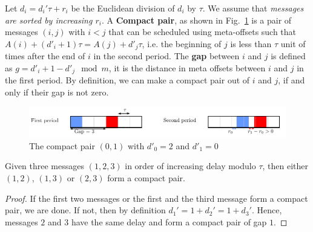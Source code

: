 \documentclass[a4paper,UKenglish,cleveref, autoref, thm-restate]{lipics-v2019}
\begin{document}


Let $d_i = d_{i}'\tau + r_i$ be the Euclidean division of $d_i$ by $\tau$. We assume that \emph{messages are sorted by increasing $r_i$}.
A \textbf{Compact pair}, as shown in Fig.~\ref{fig:compactpair} is a pair of messages $(i,j)$ with $i < j$ that can be scheduled using meta-offsets such that $A(i) + (d'_i+1)\tau = A(j) + d'_j\tau$, i.e. the beginning of $j$ is less than $\tau$ unit of times after the end of $i$ in the second period.
The \textbf{gap} between $i$ and $j$ is defined as  $g = d'_{i} + 1 - d'_{j} \mod m$, it is the distance in meta offsets between $i$ and $j$ in the first period. By definition, we can make a compact pair out of $i$ and $j$, if and only if their gap is not zero.

\begin{figure}[h]
\begin{center}

\includegraphics[scale=0.7]{compact_pair}
\end{center}
\caption{The compact pair $(0,1)$ with $d'_0 = 2$ and $d'_1 = 0$}
\label{fig:compactpair}
\end{figure}

\begin{lemma}\label{lemma:pair_find}
Given three messages $(1,2,3)$ in order of increasing delay modulo $\tau$, then either $(1,2)$, $(1,3)$ or $(2,3)$ form a compact pair. 
\end{lemma}
\begin{proof}
If the first two messages or the first and the third message form a compact pair, we are done. If not, then by definition $d_{1}' = 1 + d_{2}' = 1 + d_{3}'$. Hence, messages $2$ and $3$ have the same delay and form a compact pair of gap $1$.
\end{proof}
\end{document}
